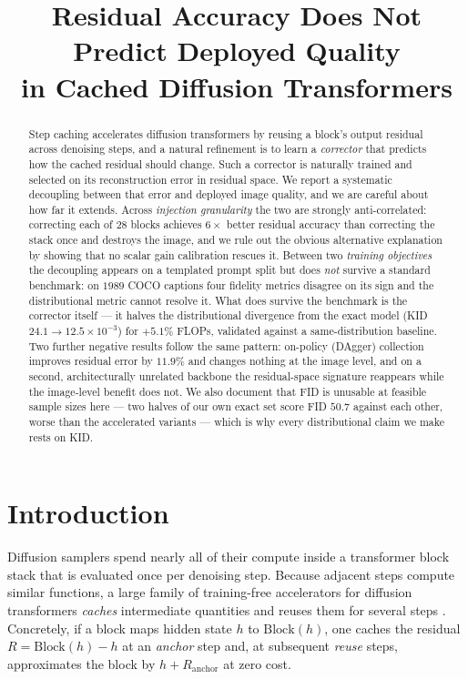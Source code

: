 \documentclass[10pt,twocolumn,letterpaper]{article}
\title{\vspace{-2em}\Large Residual Accuracy Does Not Predict Deployed Quality\\ in Cached Diffusion Transformers}
\author{}
\date{}
\begin{document}
\maketitle
\vspace{-3em}

\begin{abstract}
Step caching accelerates diffusion transformers by reusing a block's output residual
across denoising steps, and a natural refinement is to learn a \emph{corrector} that
predicts how the cached residual should change. Such a corrector is naturally trained
and selected on its reconstruction error in residual space. We report a systematic
decoupling between that error and deployed image quality, and we are careful about how
far it extends. Across \emph{injection granularity} the two are strongly
anti-correlated: correcting each of $28$ blocks achieves $6\times$ better residual
accuracy than correcting the stack once and destroys the image, and we rule out the
obvious alternative explanation by showing that no scalar gain calibration rescues it.
Between two \emph{training objectives} the decoupling appears on a templated prompt
split but does \emph{not} survive a standard benchmark: on $1989$ COCO captions four
fidelity metrics disagree on its sign and the distributional metric cannot resolve it.
What does survive the benchmark is the corrector itself --- it halves the distributional
divergence from the exact model (KID $24.1 \to 12.5 \times 10^{-3}$) for $+5.1\%$ FLOPs,
validated against a same-distribution baseline. Two further negative results follow the
same pattern: on-policy (DAgger) collection improves residual error by $11.9\%$ and
changes nothing at the image level, and on a second, architecturally unrelated backbone
the residual-space signature reappears while the image-level benefit does not. We also
document that FID is unusable at feasible sample sizes here --- two halves of our own
exact set score FID $50.7$ against each other, worse than the accelerated variants ---
which is why every distributional claim we make rests on KID.
\end{abstract}

\section{Introduction}

Diffusion samplers spend nearly all of their compute inside a transformer block
stack that is evaluated once per denoising step. Because adjacent steps compute
similar functions, a large family of training-free accelerators for diffusion transformers \cite{peebles2023dit}
\emph{caches} intermediate quantities and reuses them for several steps
\cite{ma2024deepcache,selvaraju2024fora,chen2024deltadit,liu2024teacache,zou2024toca}.
Concretely, if a block maps hidden state $h$ to $\mathrm{Block}(h)$, one caches the
residual $R = \mathrm{Block}(h) - h$ at an \emph{anchor} step and, at subsequent
\emph{reuse} steps, approximates the block by $h + R_{\text{anchor}}$ at zero cost.
\end{document}
